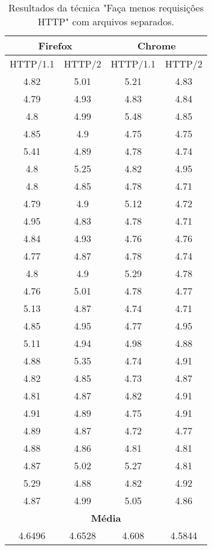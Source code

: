\begin{table}[h]
	\centering
	\caption{Resultados da técnica "Faça menos requisições HTTP" com arquivos separados.}
	\label{resultados-facamenosrequisicoeshttp-separados}
	\begin{tabular}{cccc}
		\hline
		\multicolumn{2}{c}{\textbf{Firefox}} & \multicolumn{2}{c}{\textbf{Chrome}} \\
		\hline
		HTTP/1.1 & HTTP/2 & HTTP/1.1 & HTTP/2 \\
		\hline
		4.82 & 5.01 & 5.21 & 4.83 \\
		4.79 & 4.93 & 4.83 & 4.84 \\
		4.8  & 4.99 & 5.48 & 4.85 \\
		4.85 & 4.9  & 4.75 & 4.75 \\
		5.41 & 4.89 & 4.78 & 4.74 \\
		4.8  & 5.25 & 4.82 & 4.95 \\
		4.8  & 4.85 & 4.78 & 4.71 \\
		4.79 & 4.9  & 5.12 & 4.72 \\
		4.95 & 4.83 & 4.78 & 4.71 \\
		4.84 & 4.93 & 4.76 & 4.76 \\
		4.77 & 4.87 & 4.78 & 4.74 \\
		4.8  & 4.9  & 5.29 & 4.78 \\
		4.76 & 5.01 & 4.78 & 4.77 \\
		5.13 & 4.87 & 4.74 & 4.71 \\
		4.85 & 4.95 & 4.77 & 4.95 \\
		5.11 & 4.94 & 4.98 & 4.88 \\
		4.88 & 5.35 & 4.74 & 4.91 \\
		4.82 & 4.85 & 4.73 & 4.87 \\
		4.81 & 4.87 & 4.82 & 4.91 \\
		4.91 & 4.89 & 4.75 & 4.91 \\
		4.89 & 4.87 & 4.72 & 4.77 \\
		4.88 & 4.86 & 4.81 & 4.81 \\
		4.87 & 5.02 & 5.27 & 4.81 \\
		5.29 & 4.88 & 4.82 & 4.92 \\
		4.87 & 4.99 & 5.05 & 4.86 \\
		\hline
		\multicolumn{4}{c}{\textbf{Média}} \\
		4.6496 & 4.6528 & 4.608 & 4.5844 \\
		\hline
	\end{tabular}
\end{table}